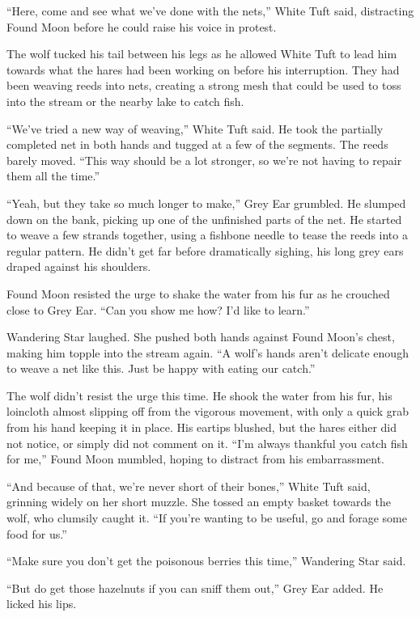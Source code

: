 ``Here, come and see what we've done with the nets,'' White Tuft said, distracting Found Moon before he could raise his voice in protest.

The wolf tucked his tail between his legs as he allowed White Tuft to lead him towards what the hares had been working on before his interruption. They had been weaving reeds into nets, creating a strong mesh that could be used to toss into the stream or the nearby lake to catch fish.

``We've tried a new way of weaving,'' White Tuft said. He took the partially completed net in both hands and tugged at a few of the segments. The reeds barely moved. ``This way should be a lot stronger, so we're not having to repair them all the time.''

``Yeah, but they take so much longer to make,'' Grey Ear grumbled. He slumped down on the bank, picking up one of the unfinished parts of the net. He started to weave a few strands together, using a fishbone needle to tease the reeds into a regular pattern. He didn't get far before dramatically sighing, his long grey ears draped against his shoulders.

Found Moon resisted the urge to shake the water from his fur as he crouched close to Grey Ear. ``Can you show me how? I'd like to learn.''

Wandering Star laughed. She pushed both hands against Found Moon's chest, making him topple into the stream again. ``A wolf's hands aren't delicate enough to weave a net like this. Just be happy with eating our catch.''

The wolf didn't resist the urge this time. He shook the water from his fur, his loincloth almost slipping off from the vigorous movement, with only a quick grab from his hand keeping it in place. His eartips blushed, but the hares either did not notice, or simply did not comment on it. ``I'm always thankful you catch fish for me,'' Found Moon mumbled, hoping to distract from his embarrassment.

``And because of that, we're never short of their bones,'' White Tuft said, grinning widely on her short muzzle. She tossed an empty basket towards the wolf, who clumsily caught it. ``If you're wanting to be useful, go and forage some food for us.''

``Make sure you don't get the poisonous berries this time,'' Wandering Star said.

``But do get those hazelnuts if you can sniff them out,'' Grey Ear added. He licked his lips.


